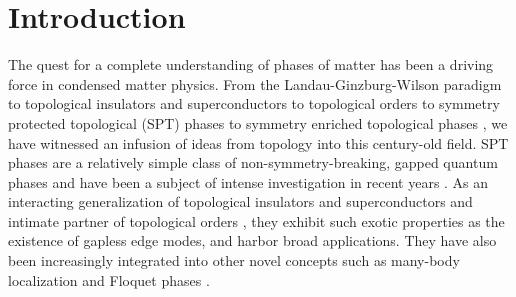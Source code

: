 \documentclass[sort&compress]{elsarticle}
\theoremstyle{theoremstyle}
\theoremstyle{framedtheoremstyle}
\theoremstyle{definitionstyle}
\theoremstyle{definitionstyle}
\theoremstyle{definitionstyle}
\theoremstyle{definitionstyle}
\theoremstyle{nameddefinitionstyle}
\theoremstyle{framednameddefinitionstyle}
\theoremstyle{proofstyle}
\theoremstyle{definitionstyle}
\begin{document}








\section{Introduction\label{sec:introduction}}

The quest for a complete understanding of phases of matter has been a driving force in condensed matter physics. From the Landau-Ginzburg-Wilson paradigm \cite{Landau_Lifshitz} to topological insulators and superconductors \cite{kane2005A, kane2005B, Qi_Hughes_Zhang, Schnyder, Kitaev_TI, Hasan_Kane, Qi_Zhang, Chiu_Teo_Schnyder_Ryu} to topological orders \cite{Wen_TO, WenNiu, Wen_book} to symmetry protected topological (SPT) phases \cite{SPT_origin} to symmetry enriched topological phases \cite{Wen_Definition}, we have witnessed an infusion of ideas from topology into this century-old field.
SPT phases are a relatively simple class of non-symmetry-breaking, gapped quantum phases and have been a subject of intense investigation in recent years \cite{Wen_review_2016}. As an interacting generalization of topological insulators and superconductors and intimate partner of topological orders \cite{1410.4540}, they exhibit such exotic properties as the existence of gapless edge modes, and harbor broad applications. They have also been increasingly integrated into other novel concepts such as many-body localization and Floquet phases \cite{Keyserlingk_Floquet, Else_Floquet, Potter_Floquet, Roy_Floquet, PhysRevB.93.245146, PhysRevB.94.085112, 1607.05277, 1512.04190, 1610.07611, 1610.06899, PhysRevLett.117.090402, 1610.03485, 1609.00006, PhysRevB.93.134207, 1605.03601}.
\end{document}
